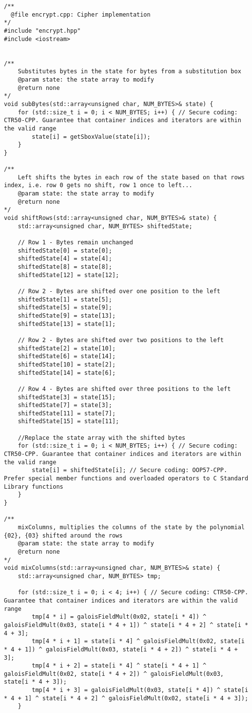 \documentclass[a4paper,12pt]{article}
\begin{document}
{\begin{lstlisting}
/**
  @file encrypt.cpp: Cipher implementation
*/
#include "encrypt.hpp"
#include <iostream>


/**
	Substitutes bytes in the state for bytes from a substitution box
	@param state: the state array to modify
	@return none
*/
void subBytes(std::array<unsigned char, NUM_BYTES>& state) {
	for (std::size_t i = 0; i < NUM_BYTES; i++) { // Secure coding: CTR50-CPP. Guarantee that container indices and iterators are within the valid range
		state[i] = getSboxValue(state[i]);
	}
}

/**
	Left shifts the bytes in each row of the state based on that rows index, i.e. row 0 gets no shift, row 1 once to left...
	@param state: the state array to modify
	@return none
*/
void shiftRows(std::array<unsigned char, NUM_BYTES>& state) {
	std::array<unsigned char, NUM_BYTES> shiftedState;

	// Row 1 - Bytes remain unchanged
	shiftedState[0] = state[0];
	shiftedState[4] = state[4];
	shiftedState[8] = state[8];
	shiftedState[12] = state[12];

	// Row 2 - Bytes are shifted over one position to the left
	shiftedState[1] = state[5];
	shiftedState[5] = state[9];
	shiftedState[9] = state[13];
	shiftedState[13] = state[1];

	// Row 2 - Bytes are shifted over two positions to the left
	shiftedState[2] = state[10];
	shiftedState[6] = state[14];
	shiftedState[10] = state[2];
	shiftedState[14] = state[6];

	// Row 4 - Bytes are shifted over three positions to the left
	shiftedState[3] = state[15];
	shiftedState[7] = state[3];
	shiftedState[11] = state[7];
	shiftedState[15] = state[11];

	//Replace the state array with the shifted bytes
	for (std::size_t i = 0; i < NUM_BYTES; i++) { // Secure coding: CTR50-CPP. Guarantee that container indices and iterators are within the valid range
		state[i] = shiftedState[i]; // Secure coding: OOP57-CPP. Prefer special member functions and overloaded operators to C Standard Library functions
	}
}

/**
	mixColumns, multiplies the columns of the state by the polynomial {02}, {03} shifted around the rows
	@param state: the state array to modify
	@return none
*/
void mixColumns(std::array<unsigned char, NUM_BYTES>& state) {
	std::array<unsigned char, NUM_BYTES> tmp;

	for (std::size_t i = 0; i < 4; i++) { // Secure coding: CTR50-CPP. Guarantee that container indices and iterators are within the valid range
		tmp[4 * i] = galoisFieldMult(0x02, state[i * 4]) ^ galoisFieldMult(0x03, state[i * 4 + 1]) ^ state[i * 4 + 2] ^ state[i * 4 + 3];
		tmp[4 * i + 1] = state[i * 4] ^ galoisFieldMult(0x02, state[i * 4 + 1]) ^ galoisFieldMult(0x03, state[i * 4 + 2]) ^ state[i * 4 + 3];
		tmp[4 * i + 2] = state[i * 4] ^ state[i * 4 + 1] ^ galoisFieldMult(0x02, state[i * 4 + 2]) ^ galoisFieldMult(0x03, state[i * 4 + 3]);
		tmp[4 * i + 3] = galoisFieldMult(0x03, state[i * 4]) ^ state[i * 4 + 1] ^ state[i * 4 + 2] ^ galoisFieldMult(0x02, state[i * 4 + 3]);
	}


\end{lstlisting}}
\end{document}
